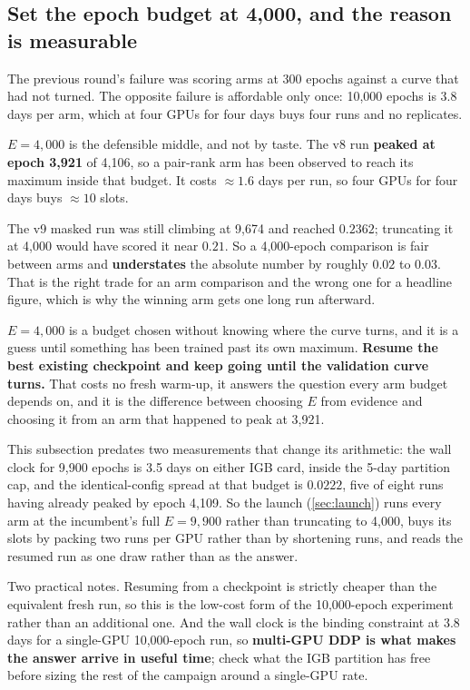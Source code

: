 \subsection{Set the epoch budget at 4,000, and the reason is measurable}

The previous round's failure was scoring arms at 300 epochs against a curve that had not
turned. The opposite failure is affordable only once: 10,000 epochs is 3.8 days per arm,
which at four GPUs for four days buys four runs and no replicates.

$E = 4{,}000$ is the defensible middle, and not by taste. The v8 run \textbf{peaked at
epoch 3,921} of 4,106, so a pair-rank arm has been observed to reach its maximum inside
that budget. It costs $\approx 1.6$ days per run, so four GPUs for four days buys
$\approx 10$ slots.

 The v9 masked run was still climbing
at 9,674 and reached $0.2362$; truncating it at 4,000 would have scored it near $0.21$.
So a 4,000-epoch comparison is fair between arms and \textbf{understates} the absolute
number by roughly $0.02$ to $0.03$. That is the right trade for an arm comparison and the
wrong one for a headline figure, which is why the winning arm gets one long run afterward.

$E = 4{,}000$ is a budget chosen without knowing where the curve turns, and it is a guess
until something has been trained past its own maximum. \textbf{Resume the best existing
checkpoint and keep going until the validation curve turns.} That costs no fresh warm-up, it
answers the question every arm budget depends on, and it is the difference between choosing
$E$ from evidence and choosing it from an arm that happened to peak at 3,921.

 This subsection predates two measurements
that change its arithmetic: the wall clock for 9,900 epochs is 3.5 days on either IGB card,
inside the 5-day partition cap, and the identical-config spread at that budget is $0.0222$,
five of eight runs having already peaked by epoch 4,109. So the launch (\cref{sec:launch})
runs every arm at the incumbent's full $E = 9{,}900$ rather than truncating to 4,000, buys
its slots by packing two runs per GPU rather than by shortening runs, and reads the resumed
run as one draw rather than as the answer.

Two practical notes. Resuming from a checkpoint is strictly cheaper than the equivalent
fresh run, so this is the low-cost form of the 10,000-epoch experiment rather than an
additional one. And the wall clock is the binding constraint at 3.8 days for a single-GPU
10,000-epoch run, so \textbf{multi-GPU DDP is what makes the answer arrive in useful time};
check what the IGB  partition has free before sizing the rest of the campaign
around a single-GPU rate.

